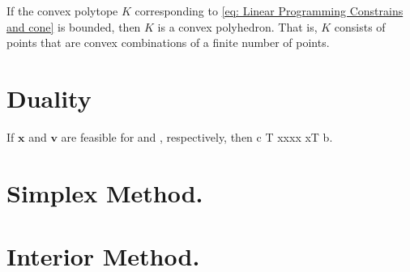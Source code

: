 \begin{corollary}
	If the convex polytope $K$ corresponding to \eqref{eq: Linear Programming Constrains and cone} is bounded, then $K$ is a convex polyhedron. That is, $K$ consists of points that are convex combinations of a finite number of points.
\end{corollary}
\section{Duality}



\begin{lemma}
If $\mathbf{x}$ and $\mathbf{v}$ are feasible for  and , respectively, then c T xxxx xT b.
\end{lemma}
\section{Simplex Method.}

\section{Interior Method.}
